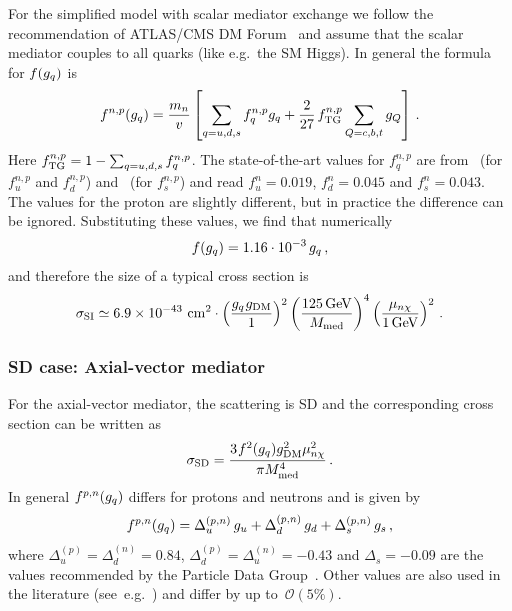 For the simplified model with scalar mediator exchange we follow the recommendation of  ATLAS/CMS  DM Forum~\cite{Abercrombie:2015wmb} and assume that the scalar mediator couples to all quarks (like e.g.~the  SM Higgs). In general the formula for $f(g_q)$ is
\begin{equation}
\label{eq:fscalar}
f^{n,p}(g_q) = \frac{m_{n}}{v} \left[\sum_{q=u,d,s}f_q^{n,p} g_q + \frac{2}{27} \hspace{0.5mm} f^{n,p}_{\rm{TG}}\sum_{Q=c,b,t} g_Q \right]\,.
\end{equation}
Here $f^{n,p}_{\rm{TG}}=1-\sum_{q=u,d,s}f_q^{n,p}$. The state-of-the-art values for $f_q^{n,p}$ are from~\cite{Hoferichter:2015dsa} (for $f_u^{n,p}$ and $f_d^{n,p}$) and~\cite{Junnarkar:2013ac} (for $f_s^{n,p}$) and read  $f_u^{n}=0.019$, $f_d^{n}=0.045$ and $f_s^{n}=0.043$. The values for the proton are slightly different, but in practice the difference can be ignored. Substituting these values, we find that numerically
\begin{equation}
 f(g_q)  = 1.16 \cdot 10^{-3} \hspace{0.5mm} g_q \,,
\end{equation}
and therefore the size of a typical  cross section is
\begin{equation}
\sigma_{\rm{SI}} \simeq 6.9\times 10^{-43}~\mathrm{cm}^2\cdot\left(\frac{g_q \hspace{0.25mm} g_{\rm{DM}}}{1}\right)^2\left( \frac{125 \, \mathrm{GeV}}{M_{\rm{med}}}\right)^4\left(\frac{\mu_{n\chi}}{1 \, \mathrm{GeV}} \right)^2\,.
\end{equation}


\subsubsection{SD case: Axial-vector mediator}
\label{sub:spindependent}

For the axial-vector mediator, the scattering is  SD and the corresponding  cross section can be written as
\begin{equation}
\sigma_{\rm{SD}}=\frac{3 \hspace{0.25mm} f^2(g_q) g_{\rm{DM}}^2 \mu^2_{n\chi}}{\pi M_{\rm{med}}^4}\,.
\end{equation}
In general $f^{p,n}(g_q)$ differs for protons and neutrons and is given by
\begin{equation}
 f^{p,n}(g_q) = \Delta^{(p,n)}_u \, g_u + \Delta^{(p,n)}_d \, g_d + \Delta^{(p,n)}_s \, g_s \,,
\end{equation}
where $\Delta^{(p)}_u= \Delta^{(n)}_d = 0.84$, $\Delta^{(p)}_d = \Delta^{(n)}_u = -0.43$ and $\Delta_s=-0.09$ are the values recommended by  the Particle Data Group~\cite{Agashe:2014kda}. Other values are also used in the literature (see~e.g.~\cite{Ellis:2008hf}) and differ by up to~$\mathcal{O}(5\%)$.

